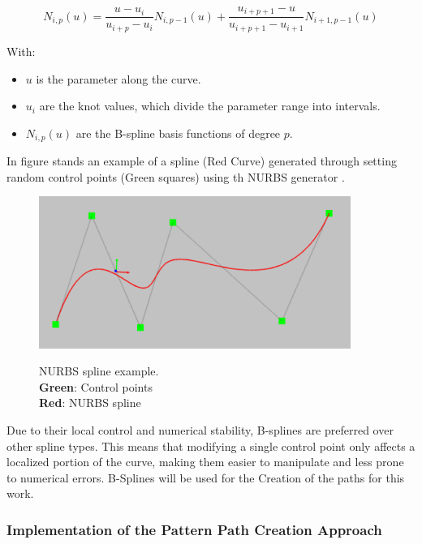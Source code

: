 \begin{equation}
N_{i,p}(u) = \frac{u - u_i}{u_{i+p} - u_i} N_{i,p-1}(u) + \frac{u_{i+p+1} - u}{u_{i+p+1} - u_{i+1}} N_{i+1,p-1}(u)
\end{equation}


With:
\begin{itemize}
    \item \( u \) is the parameter along the curve.
    \item \( u_i \) are the knot values, which divide the parameter range into intervals.
    \item \( N_{i,p}(u) \) are the B-spline basis functions of degree \( p \).
\end{itemize}

In figure  stands an example of a spline (Red Curve) generated through setting random 
control points (Green squares) using th NURBS generator \cite{R32}. 

\begin{figure}[H]
    \begin{center}
    \includegraphics[width=4in]{images/Chap2/control-spline.png}\\
    \caption{NURBS spline example.\\
    \textbf{Green}: Control points\\
    \textbf{Red}: NURBS spline}
    \label{NURBS} 
    \end{center}
\end{figure}

Due to their local control and numerical stability, B-splines are preferred over other spline types. 
This means that modifying a single control point only affects a localized portion of the curve, making 
them easier to manipulate and less prone to numerical errors.
B-Splines will be used for the Creation of the paths for this work.

\subsubsection{Implementation of the Pattern Path Creation Approach}

